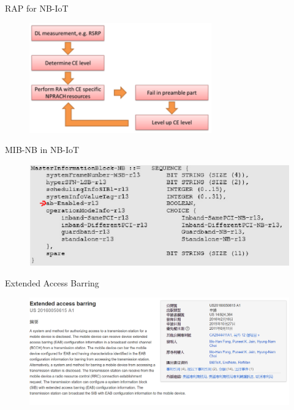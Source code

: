 \documentclass{beamer}
\begin{document}
\begin{frame} {RAP for NB-IoT \cite{whitepaper}} 
    \begin{figure}[t]
    \centering
    \includegraphics[width=0.7\textwidth]{figures/rapInNB.png}
    \end{figure}
\end{frame}

\begin{frame} {MIB-NB in NB-IoT \cite{spec}} 
    \begin{figure}[t]
    \centering
    \includegraphics[width=1\textwidth]{figures/mibnb.png}
    \end{figure}
\end{frame}

\begin{frame} {Extended Access Barring}
    \begin{figure}[t]
    \centering
    \includegraphics[width=1\textwidth]{figures/eab.png}
    \end{figure}
\end{frame}
\end{document}
